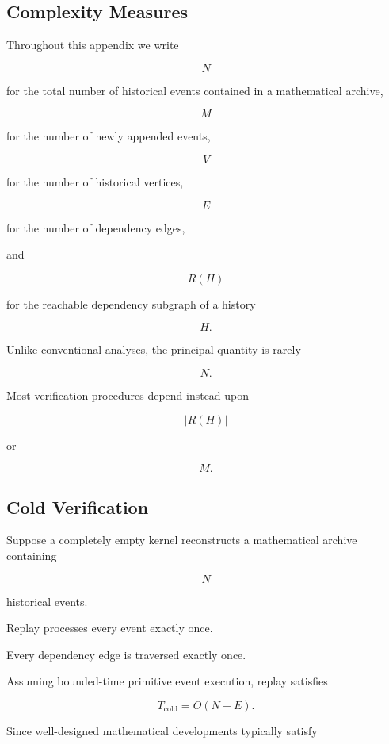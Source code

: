 \documentclass[12pt,oneside]{article}
\theoremstyle{definition}
\theoremstyle{remark}
\begin{document}

\subsection{Complexity Measures}

Throughout this appendix we write

\[
N
\]

for the total number of historical events contained in a mathematical archive,

\[
M
\]

for the number of newly appended events,

\[
V
\]

for the number of historical vertices,

\[
E
\]

for the number of dependency edges,

and

\[
R(H)
\]

for the reachable dependency subgraph of a history

\[
H.
\]

Unlike conventional analyses, the principal quantity is rarely

\[
N.
\]

Most verification procedures depend instead upon

\[
|R(H)|
\]

or

\[
M.
\]


\subsection{Cold Verification}

Suppose a completely empty kernel reconstructs a mathematical archive
containing

\[
N
\]

historical events.

Replay processes every event exactly once.

Every dependency edge is traversed exactly once.

Assuming bounded-time primitive event execution, replay satisfies

\[
T_{\mathrm{cold}}
=
O(N+E).
\]

Since well-designed mathematical developments typically satisfy
\end{document}
